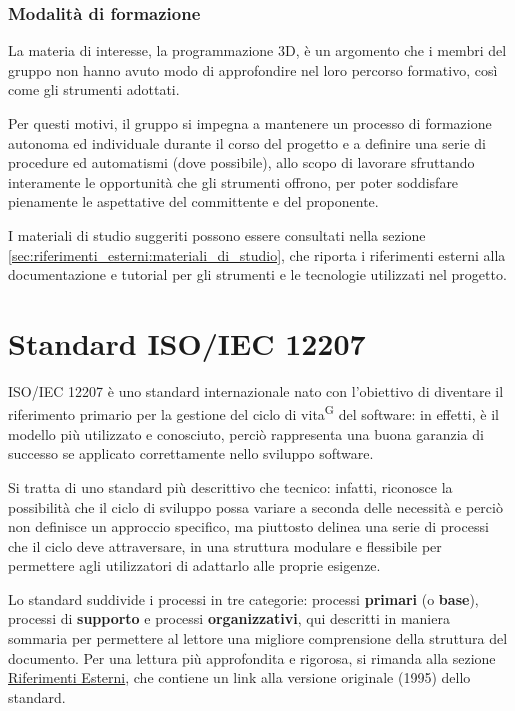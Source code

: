 \subsubsection{Modalità di formazione}
La materia di interesse, la programmazione 3D, è un argomento che i membri del gruppo non hanno avuto modo di approfondire nel loro percorso formativo, così come gli strumenti adottati.
\par Per questi motivi, il gruppo si impegna a mantenere un processo di formazione autonoma ed individuale durante il corso del progetto e a definire una serie di procedure ed automatismi (dove possibile), allo scopo di lavorare sfruttando interamente le opportunità che gli strumenti offrono, per poter soddisfare pienamente le aspettative del committente e del proponente.
\par I materiali di studio suggeriti possono essere consultati nella sezione \ref{sec:riferimenti_esterni:materiali_di_studio}, che riporta i riferimenti esterni alla documentazione e tutorial per gli strumenti e le tecnologie utilizzati nel progetto.

\newpage
\newpage
\section{Standard ISO/IEC 12207}\label{sec:standard_iso/iec_12207}
ISO/IEC 12207 è uno standard internazionale nato con l'obiettivo di diventare il riferimento primario per la gestione del ciclo di vita\textsuperscript{G} del software: in effetti, è il modello più utilizzato e conosciuto, perciò rappresenta una buona garanzia di successo se applicato correttamente nello sviluppo software.
\par Si tratta di uno standard più descrittivo che tecnico: infatti, riconosce la possibilità che il ciclo di sviluppo possa variare a seconda delle necessità e perciò non definisce un approccio specifico, ma piuttosto delinea una serie di processi che il ciclo deve attraversare, in una struttura modulare e flessibile per permettere agli utilizzatori di adattarlo alle proprie esigenze.
\par Lo standard suddivide i processi in tre categorie: processi \textbf{primari} (o \textbf{base}), processi di \textbf{supporto} e processi \textbf{organizzativi}, qui descritti in maniera sommaria per permettere al lettore una migliore comprensione della struttura del documento. Per una lettura più approfondita e rigorosa, si rimanda alla sezione \hyperref[sec:riferimenti_esterni]{Riferimenti Esterni}, che contiene un link alla versione originale (1995) dello standard.

